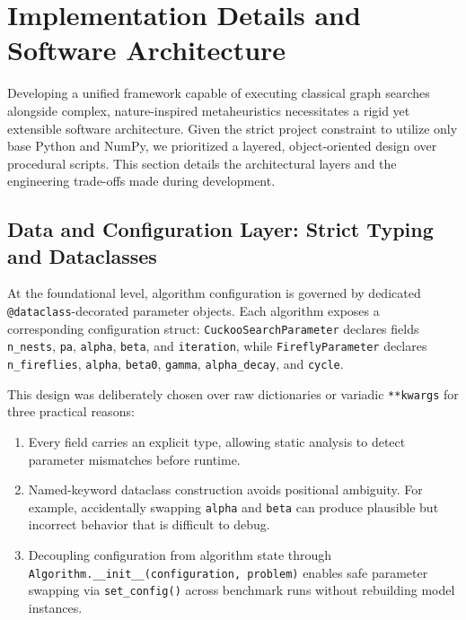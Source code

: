 \section{Implementation Details and Software Architecture}
\label{sec:implementation}

Developing a unified framework capable of executing classical graph searches alongside complex, nature-inspired metaheuristics necessitates a rigid yet extensible software architecture. Given the strict project constraint to utilize only base Python and NumPy, we prioritized a layered, object-oriented design over procedural scripts. This section details the architectural layers and the engineering trade-offs made during development.

\subsection{Data and Configuration Layer: Strict Typing and Dataclasses}
At the foundational level, algorithm configuration is governed by dedicated \texttt{@dataclass}-decorated parameter objects. Each algorithm exposes a corresponding configuration struct: \texttt{CuckooSearchParameter} declares fields \texttt{n\_nests}, \texttt{pa}, \texttt{alpha}, \texttt{beta}, and \texttt{iteration}, while \texttt{FireflyParameter} declares \texttt{n\_fireflies}, \texttt{alpha}, \texttt{beta0}, \texttt{gamma}, \texttt{alpha\_decay}, and \texttt{cycle}.

This design was deliberately chosen over raw dictionaries or variadic \texttt{**kwargs} for three practical reasons:
\begin{enumerate}
    \item Every field carries an explicit type, allowing static analysis to detect parameter mismatches before runtime.
    \item Named-keyword dataclass construction avoids positional ambiguity. For example, accidentally swapping \texttt{alpha} and \texttt{beta} can produce plausible but incorrect behavior that is difficult to debug.
    \item Decoupling configuration from algorithm state through \texttt{Algorithm.\_\_init\_\_(configuration, problem)} enables safe parameter swapping via \texttt{set\_config()} across benchmark runs without rebuilding model instances.
\end{enumerate}


